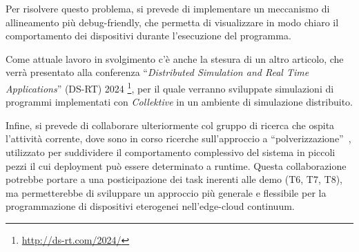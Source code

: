 \documentclass[13pt, a4paper]{article}
\newcommand{\ck}{\emph{Collektive}}
\begin{document}
Per risolvere questo problema, si prevede di implementare un meccanismo di allineamento più debug-friendly,
    che permetta di visualizzare in modo chiaro il comportamento dei dispositivi durante l'esecuzione del programma.

Come attuale lavoro in svolgimento c'è anche la stesura di un altro articolo, che verrà presentato alla conferenza
    ``\emph{Distributed Simulation and Real Time Applications}'' (DS-RT) 2024
    \footnote{\url{http://ds-rt.com/2024/}},
    per il quale verranno sviluppate simulazioni di programmi implementati con \ck{} in un ambiente di simulazione distribuito.

Infine, si prevede di collaborare ulteriormente col gruppo di ricerca che ospita l'attività corrente,
dove sono in corso
    ricerche sull'approccio a ``polverizzazione''~\cite{fi12110203},
    utilizzato per suddividere il comportamento complessivo del sistema
in piccoli pezzi il cui deployment può essere determinato a runtime.
%
Questa collaborazione potrebbe portare a una posticipazione dei task inerenti alle demo (T6, T7, T8), ma permetterebbe di sviluppare
    un approccio più generale e flessibile per la programmazione di dispositivi eterogenei nell'edge-cloud continuum.





\end{document}
